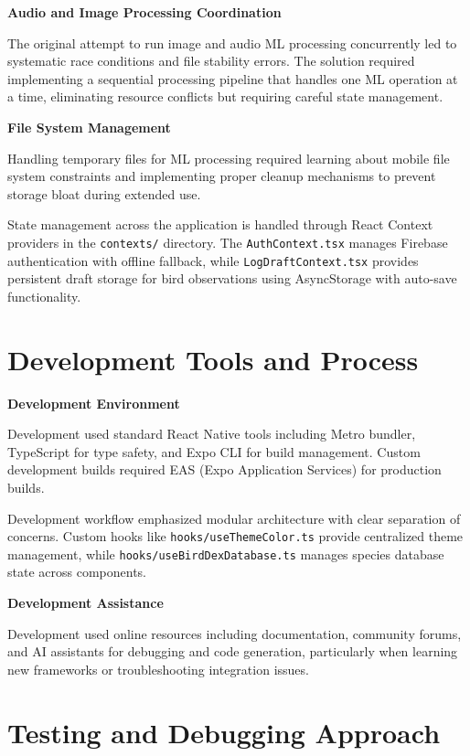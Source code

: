 \textbf{Audio and Image Processing Coordination}

The original attempt to run image and audio ML processing concurrently led to systematic race conditions and file stability errors. The solution required implementing a sequential processing pipeline that handles one ML operation at a time, eliminating resource conflicts but requiring careful state management.

\textbf{File System Management}

Handling temporary files for ML processing required learning about mobile file system constraints and implementing proper cleanup mechanisms to prevent storage bloat during extended use.

State management across the application is handled through React Context providers in the \texttt{contexts/} directory. The \texttt{AuthContext.tsx} manages Firebase authentication with offline fallback, while \texttt{LogDraftContext.tsx} provides persistent draft storage for bird observations using AsyncStorage with auto-save functionality.




\section{Development Tools and Process}

\textbf{Development Environment}

Development used standard React Native tools including Metro bundler, TypeScript for type safety, and Expo CLI for build management. Custom development builds required EAS (Expo Application Services) for production builds.

Development workflow emphasized modular architecture with clear separation of concerns. Custom hooks like \texttt{hooks/useThemeColor.ts} provide centralized theme management, while \texttt{hooks/useBirdDexDatabase.ts} manages species database state across components.


\textbf{Development Assistance}

Development used online resources including documentation, community forums, and AI assistants for debugging and code generation, particularly when learning new frameworks or troubleshooting integration issues.

\section{Testing and Debugging Approach}

